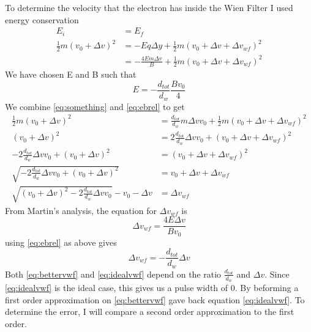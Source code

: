 \documentclass[12pt,letterpaper]{letter}
\newcommand{\dv}{\Delta v}
\begin{document}
To determine the velocity that the electron has inside the Wien Filter I used energy conservation
\begin{align} 
E_i &=  E_f \\
\frac{1}{2}m\left( v_0 +\dv\right)^2 &= - Eq\Delta y + \frac{1}{2} m\left( v_0 + \dv +\dv_{wf} \right)^2\\
&= - \frac{4Em\dv}{B} + \frac{1}{2} m\left( v_0 + \dv +\dv_{wf} \right)^2
\label{eq:something}
\end{align}
We have chosen E and B such that
\begin{equation}
   \label{eq:ebrel}
   E = -\frac{d_{tot}}{d_w}\frac{Bv_0}{4}
\end{equation}
We combine \ref{eq:something} and \ref{eq:ebrel} to get
\begin{align}
   \frac{1}{2}m\left( v_0 +\dv\right)^2 &= \frac{d_{tot}}{d_w} m\dv v_0+\frac{1}{2}m(v_0+\dv + \dv_{wf})^2\\
   \left( v_0 +\dv\right)^2 &= 2\frac{d_{tot}}{d_w} \dv v_0+(v_0+\dv + \dv_{wf})^2\\
 - 2\frac{d_{tot}}{d_w} \dv v_0 +  \left( v_0 +\dv\right)^2 &=  (v_0+\dv + \dv_{wf})^2\\
 \sqrt{- 2\frac{d_{tot}}{d_w} \dv v_0 +  \left( v_0 +\dv\right)^2} &=  v_0+\dv + \dv_{wf}\\
 \sqrt{\left( v_0 +\dv\right)^2-2\frac{d_{tot}}{d_w} \dv v_0 }-v_0 -\dv&=  \dv_{wf}
 \label{eq:bettervwf}
\end{align}
From Martin's analysis, the equation for $\dv_{wf}$ is
\begin{equation}
   \dv_{wf} = \frac{4E\dv}{B v_0}
\end{equation}
using \eqref{eq:ebrel} as above gives
\begin{equation}
   \dv_{wf} = -\frac{d_{tot}}{d_w}\dv
   \label{eq:idealvwf}
\end{equation}
Both \eqref{eq:bettervwf} and \eqref{eq:idealvwf} depend on the ratio $\frac{d_{tot}}{d_w}$ and $\dv$. Since \eqref{eq:idealvwf} is the ideal case, this gives us a pulse width of $0$. By beforming a first order approximation on \eqref{eq:bettervwf} gave back equation \eqref{eq:idealvwf}. To determine the error, I will compare a second order approximation to the first order. 
\end{document}
